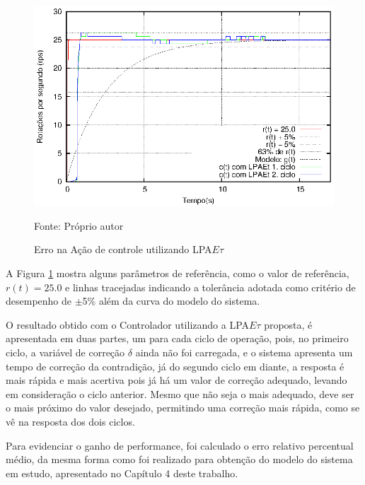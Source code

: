 \begin{figure}[!htb]%
\caption{Erro na Ação de controle utilizando LPA$E\tau$}
\vspace{-1cm}\center\includegraphics[scale=1.6]{./imagens/LPAEt-erro.eps}
\label{fig:LPAEterro}

{\small Fonte: Próprio autor}
\end{figure}






A Figura \ref{fig:LPAEterro} mostra alguns parâmetros de 
referência, como o valor de referência, 
$r(t) = 25.0$ e linhas tracejadas indicando a 
tolerância adotada como critério de desempenho de 
$\pm $5\% além da curva do modelo do sistema.

O resultado obtido com o Controlador utilizando a 
LPA$E\tau$ proposta, é apresentada em duas partes,
um para cada ciclo de operação, 
pois, no primeiro ciclo, a variável de correção $\delta$
ainda não foi carregada, 
e o sistema apresenta um tempo de correção da contradição, 
já do segundo ciclo em diante, 
a resposta é mais rápida e mais acertiva pois já há um
valor de correção adequado, 
levando em consideração o ciclo anterior. 
Mesmo que não seja o mais adequado, 
deve ser o mais próximo do valor desejado, 
permitindo uma correção mais rápida, 
como se vê na resposta dos dois ciclos.


Para evidenciar o ganho de performance, 
foi calculado o erro relativo percentual médio,
da mesma forma como foi realizado para obtenção do modelo
do sistema em estudo, 
apresentado no Capítulo 4 deste trabalho.


